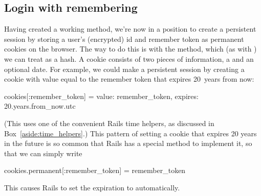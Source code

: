 \subsection{Login with remembering} %
\label{sec:login_with_remembering}

Having created a working  method, we're now in a position to create a persistent session by storing a user's (encrypted) id and remember token as permanent cookies on the browser. The way to do this is with the  method, which (as with ) we can treat as a hash. A cookie consists of two pieces of information, a  and an optional  date. For example, we could make a persistent session by creating a cookie with value equal to the remember token that expires 20~years from now:

\begin{code}
cookies[:remember_token] = { value:   remember_token,
                             expires: 20.years.from_now.utc }
\end{code}

\noindent (This uses one of the convenient Rails time helpers, as discussed in Box~\ref{aside:time_helpers}.) This pattern of setting a cookie that expires 20 years in the future is so common that Rails has a special  method to implement it, so that we can simply write

\begin{code}
cookies.permanent[:remember_token] = remember_token
\end{code}

\noindent This causes Rails to set the expiration to  automatically.

